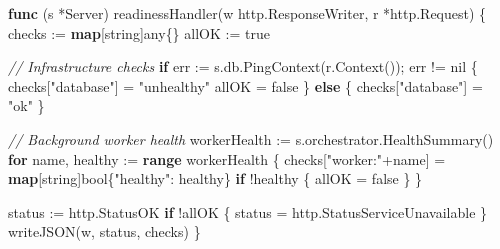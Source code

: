 \documentclass[
]{article}
\newenvironment{Shaded}{}{}
\newcommand{\CommentTok}[1]{\textcolor[rgb]{0.38,0.63,0.69}{\textit{#1}}}
\newcommand{\ControlFlowTok}[1]{\textcolor[rgb]{0.00,0.44,0.13}{\textbf{#1}}}
\newcommand{\DataTypeTok}[1]{\textcolor[rgb]{0.56,0.13,0.00}{#1}}
\newcommand{\KeywordTok}[1]{\textcolor[rgb]{0.00,0.44,0.13}{\textbf{#1}}}
\newcommand{\NormalTok}[1]{#1}
\newcommand{\OperatorTok}[1]{\textcolor[rgb]{0.40,0.40,0.40}{#1}}
\newcommand{\OtherTok}[1]{\textcolor[rgb]{0.00,0.44,0.13}{#1}}
\newcommand{\StringTok}[1]{\textcolor[rgb]{0.25,0.44,0.63}{#1}}
\begin{document}
\begin{Shaded}
\begin{Highlighting}[]
\KeywordTok{func} \OperatorTok{(}\NormalTok{s }\OperatorTok{*}\NormalTok{Server}\OperatorTok{)}\NormalTok{ readinessHandler}\OperatorTok{(}\NormalTok{w http}\OperatorTok{.}\NormalTok{ResponseWriter}\OperatorTok{,}\NormalTok{ r }\OperatorTok{*}\NormalTok{http}\OperatorTok{.}\NormalTok{Request}\OperatorTok{)} \OperatorTok{\{}
\NormalTok{    checks }\OperatorTok{:=} \KeywordTok{map}\OperatorTok{[}\DataTypeTok{string}\OperatorTok{]}\NormalTok{any}\OperatorTok{\{\}}
\NormalTok{    allOK }\OperatorTok{:=} \OtherTok{true}

    \CommentTok{// Infrastructure checks}
    \ControlFlowTok{if}\NormalTok{ err }\OperatorTok{:=}\NormalTok{ s}\OperatorTok{.}\NormalTok{db}\OperatorTok{.}\NormalTok{PingContext}\OperatorTok{(}\NormalTok{r}\OperatorTok{.}\NormalTok{Context}\OperatorTok{());}\NormalTok{ err }\OperatorTok{!=} \OtherTok{nil} \OperatorTok{\{}
\NormalTok{        checks}\OperatorTok{[}\StringTok{"database"}\OperatorTok{]} \OperatorTok{=} \StringTok{"unhealthy"}
\NormalTok{        allOK }\OperatorTok{=} \OtherTok{false}
    \OperatorTok{\}} \ControlFlowTok{else} \OperatorTok{\{}
\NormalTok{        checks}\OperatorTok{[}\StringTok{"database"}\OperatorTok{]} \OperatorTok{=} \StringTok{"ok"}
    \OperatorTok{\}}

    \CommentTok{// Background worker health}
\NormalTok{    workerHealth }\OperatorTok{:=}\NormalTok{ s}\OperatorTok{.}\NormalTok{orchestrator}\OperatorTok{.}\NormalTok{HealthSummary}\OperatorTok{()}
    \ControlFlowTok{for}\NormalTok{ name}\OperatorTok{,}\NormalTok{ healthy }\OperatorTok{:=} \KeywordTok{range}\NormalTok{ workerHealth }\OperatorTok{\{}
\NormalTok{        checks}\OperatorTok{[}\StringTok{"worker:"}\OperatorTok{+}\NormalTok{name}\OperatorTok{]} \OperatorTok{=} \KeywordTok{map}\OperatorTok{[}\DataTypeTok{string}\OperatorTok{]}\DataTypeTok{bool}\OperatorTok{\{}\StringTok{"healthy"}\OperatorTok{:}\NormalTok{ healthy}\OperatorTok{\}}
        \ControlFlowTok{if} \OperatorTok{!}\NormalTok{healthy }\OperatorTok{\{}
\NormalTok{            allOK }\OperatorTok{=} \OtherTok{false}
        \OperatorTok{\}}
    \OperatorTok{\}}

\NormalTok{    status }\OperatorTok{:=}\NormalTok{ http}\OperatorTok{.}\NormalTok{StatusOK}
    \ControlFlowTok{if} \OperatorTok{!}\NormalTok{allOK }\OperatorTok{\{}
\NormalTok{        status }\OperatorTok{=}\NormalTok{ http}\OperatorTok{.}\NormalTok{StatusServiceUnavailable}
    \OperatorTok{\}}
\NormalTok{    writeJSON}\OperatorTok{(}\NormalTok{w}\OperatorTok{,}\NormalTok{ status}\OperatorTok{,}\NormalTok{ checks}\OperatorTok{)}
\OperatorTok{\}}
\end{Highlighting}
\end{Shaded}
\end{document}
